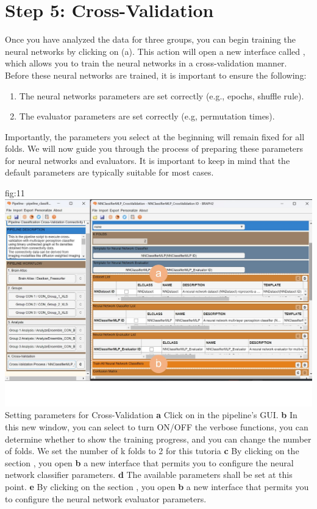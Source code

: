 \documentclass[justified]{tufte-handout}
\begin{document}
{\clearpage
\section{Step 5: Cross-Validation}

Once you have analyzed the data for three groups, you can begin training the neural networks by clicking on  (a). 
This action will open a new interface called , which allows you to train the neural networks in a cross-validation manner.
Before these neural networks are trained, it is important to ensure the following: 
\begin{enumerate}
	\item The neural networks parameters are set correctly (e.g., epochs, shuffle rule).
	\item The evaluator parameters are set correctly (e.g, permutation times).
\end{enumerate}

Importantly, the parameters you select at the beginning will remain fixed for all folds. We will now guide you through the process of preparing these parameters for neural networks and evaluators. It is important to keep in mind that the default parameters are typically suitable for most cases.

	{fig:11}
	{
	\includegraphics{fig11.jpg}
	}
	{Setting parameters for Cross-Validation}
	{
	{\bf a} Click on  in the pipeline's GUI.
	{\bf b} In this new window, you can select to turn ON/OFF the verbose functions, you can determine whether to show the training progress, and you can change the number of folds.
 	We set the number of k folds to 2 for this tutoria
	{\bf c} By clicking on the section , you open {\bf b} a new interface that permits you to configure the neural network classifier parameters.
	{\bf d} The available parameters shall be set at this point.
	{\bf e} By clicking on the section , you open {\bf b} a new interface that permits you to configure the neural network evaluator parameters.
	}

}
\end{document}
